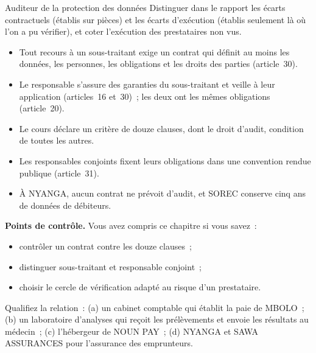 \begin{boxmetier}{Auditeur de la protection des données}
Distinguer dans le rapport les écarts contractuels (établis sur pièces) et
les écarts d'exécution (établis seulement là où l'on a pu vérifier), et
coter \NEK{} l'exécution des prestataires non vus.
\end{boxmetier}

\begin{boxresume}
\begin{itemize}
    \item Tout recours à un sous-traitant exige un contrat qui définit au
          moins les données, les personnes, les obligations et les droits
          des parties (article~30).
    \item Le responsable s'assure des garanties du sous-traitant et veille à
          leur application (articles~16 et~30)~; les deux ont les mêmes
          obligations (article~20).
    \item Le cours déclare un critère de douze clauses, dont le droit
          d'audit, condition de toutes les autres.
    \item Les responsables conjoints fixent leurs obligations dans une
          convention rendue publique (article~31).
    \item À NYANGA, aucun contrat ne prévoit d'audit, et SOREC conserve cinq
          ans de données de débiteurs.
\end{itemize}
\end{boxresume}

\begin{boxinfo}
\textbf{Points de contrôle.} Vous avez compris ce chapitre si vous savez~:
\begin{itemize}
    \item contrôler un contrat contre les douze clauses~;
    \item distinguer sous-traitant et responsable conjoint~;
    \item choisir le cercle de vérification adapté au risque d'un
          prestataire.
\end{itemize}
\end{boxinfo}

\begin{boxexo}[title={\ding{45}\quad Exercice~10.1. Sous-traitant ou conjoint \niveaubase}]
Qualifiez la relation~: (a) un cabinet comptable qui établit la paie de
MBOLO~; (b) un laboratoire d'analyses qui reçoit les prélèvements et
envoie les résultats au médecin~; (c) l'hébergeur de NOUN PAY~; (d) NYANGA
et SAWA ASSURANCES pour l'assurance des emprunteurs.
\end{boxexo}

